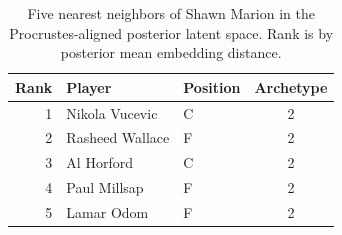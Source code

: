 \begin{table}[htbp]
  \centering\small
  \begin{tabular}{rllc}
    \toprule
    Rank & Player & Position & Archetype \\
    \midrule
    1 & Nikola Vucevic & C & 2 \\
    2 & Rasheed Wallace & F & 2 \\
    3 & Al Horford & C & 2 \\
    4 & Paul Millsap & F & 2 \\
    5 & Lamar Odom & F & 2 \\
    \bottomrule
  \end{tabular}
  \caption{Five nearest neighbors of Shawn Marion in the Procrustes-aligned posterior latent space. Rank is by posterior mean embedding distance.}
\end{table}

